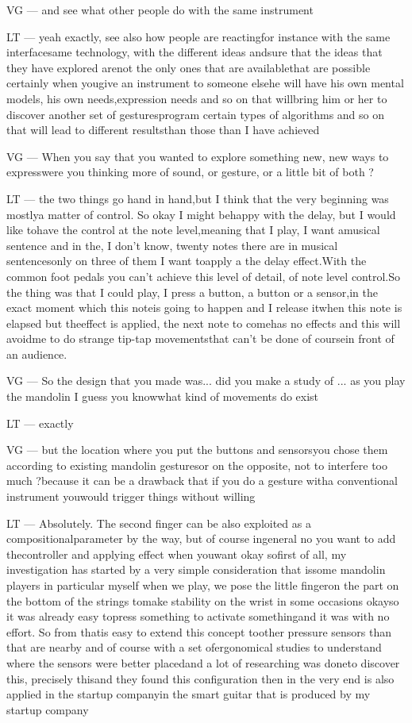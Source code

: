VG — and see what other people do with the same instrument

LT — yeah exactly, see also how people are reactingfor instance with the same interfacesame technology, with the different ideas andsure that the ideas that they have explored arenot the only ones that are availablethat are possible certainly when yougive an instrument to someone elsehe will have his own mental models, his own needs,expression needs and so on that willbring him or her to discover another set of gesturesprogram certain types of algorithms and so on that will lead to different resultsthan those than I have achieved

VG — When you say that you wanted to explore something new, new ways to expresswere you thinking more of sound, or gesture, or a little bit of both ?

LT — the two things go hand in hand,but I think that the very beginning was mostlya matter of control. So okay I might behappy with the delay, but I would like tohave the control at the note level,meaning that I play, I want amusical sentence and in the, I don't know, twenty notes there are in musical sentencesonly on three of them I want toapply a the delay effect.With the common foot pedals you can't achieve this level of detail, of note level control.So the thing was that I could play, I press a button, a button or a sensor,in the exact moment which this noteis going to happen and I release itwhen this note is elapsed but theeffect is applied, the next note to comehas no effects and this will avoidme to do strange tip-tap movementsthat can't be done of coursein front of an audience.

VG — So the design that you made was... did you make a study of ... as you play the mandolin I guess you knowwhat kind of movements do exist 

LT — exactly

VG — but the location where you put the buttons and sensorsyou chose them according to existing mandolin gesturesor on the opposite, not to interfere too much ?because it can be a drawback that if you do a gesture witha conventional instrument youwould trigger things without willing

LT — Absolutely. The second finger can be also exploited as a compositionalparameter by the way, but of course ingeneral no you want to add thecontroller and applying effect when youwant okay sofirst of all, my investigation has started by a very simple consideration that issome mandolin players in particular myself when we play, we pose the little fingeron the part on the bottom of the strings tomake stability on the wrist in some occasions okayso it was already easy topress something to activate somethingand it was with no effort. So from thatis easy to extend this concept toother pressure sensors than that are nearby and of course with a set ofergonomical studies to understand where the sensors were better placedand a lot of researching was doneto discover this, precisely thisand they found this configuration then in the very end is also applied in the startup companyin the smart guitar that is produced by my startup company

